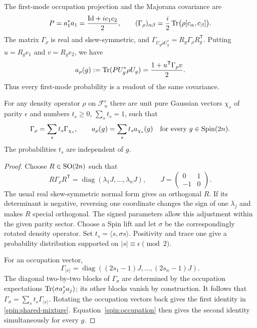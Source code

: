 The first-mode occupation projection and the Majorana covariance are
\begin{equation}
 P=a_1^*a_1=\frac{\mathrm{Id}+i c_1c_2}{2},\qquad
 (\Gamma_\rho)_{\alpha\beta}
 =\frac i2\operatorname{Tr}\bigl(\rho[c_\alpha,c_\beta]\bigr).
 \label{spin:covariance}
\end{equation}
The matrix $\Gamma_\rho$ is real and skew-symmetric, and
$\Gamma_{U_g\rho U_g^*}=R_g\Gamma_\rho R_g^{\mathsf T}$.
Putting $u=R_ge_1$ and $v=R_ge_2$, we have
\begin{equation}
 a_\rho(g):=\operatorname{Tr}(PU_g^*\rho U_g)
 =\frac{1+u^{\mathsf T}\Gamma_\rho v}{2}.
 \label{spin:occupation}
\end{equation}
Thus every first-mode probability is a readout of the same covariance.

\begin{lemma}
\label{spin:covariance-mixture}
For any density operator $\rho$ on $\mathcal F_n^\epsilon$ there are
unit pure Gaussian vectors $\chi_s$ of parity $\epsilon$ and numbers
$t_s\ge0$, $\sum_st_s=1$, such that
\begin{equation}
 \Gamma_\rho=\sum_st_s\Gamma_{\chi_s},
 \qquad
 a_\rho(g)=\sum_st_sa_{\chi_s}(g)\quad\hbox{for every }g\in\operatorname{Spin}(2n).
 \label{spin:shared-mixture}
\end{equation}
The probabilities $t_s$ are independent of $g$.
\end{lemma}
\begin{proof}
Choose $R\in\operatorname{SO}(2n)$ such that
\[
 R\Gamma_\rho R^{\mathsf T}
 =\operatorname{diag}(\lambda_1J,\ldots,\lambda_nJ),
 \qquad J=\begin{pmatrix}0&1\\-1&0\end{pmatrix}.
\]
The usual real skew-symmetric normal form gives an orthogonal $R$.
If its determinant is negative, reversing one coordinate changes the
sign of one $\lambda_j$ and makes $R$ special orthogonal.  The signed
parameters allow this adjustment within the given parity sector.
Choose a Spin lift and let $\sigma$ be the correspondingly rotated
density operator.  Set $t_s=\langle s,\sigma s\rangle$.  Positivity and
trace one give a probability distribution supported on
$|s|\equiv\epsilon\pmod2$.

For an occupation vector,
\[
 \Gamma_{|s\rangle}
 =\operatorname{diag}((2s_1-1)J,\ldots,(2s_n-1)J).
\]
The diagonal two-by-two blocks of $\Gamma_\sigma$ are determined by the
occupation expectations $\operatorname{Tr}(\sigma a_j^*a_j)$; its other blocks vanish
by construction.  It follows that
$\Gamma_\sigma=\sum_st_s\Gamma_{|s\rangle}$.
Rotating the occupation vectors back gives the first identity in
\eqref{spin:shared-mixture}.  Equation~\eqref{spin:occupation} then gives
the second identity simultaneously for every $g$.
\end{proof}

